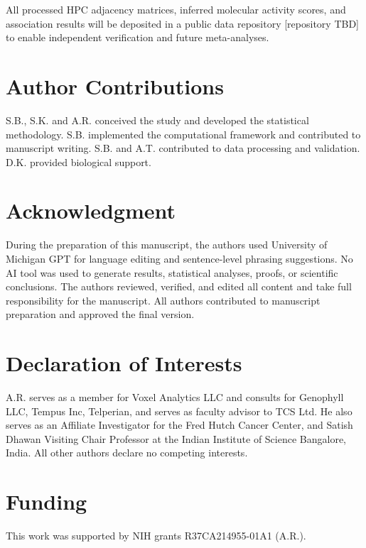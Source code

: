\documentclass[pdflatex,article,12pt]{article}
\begin{document}
All processed HPC adjacency matrices, inferred molecular activity scores, and association results will be deposited in a public data repository [repository TBD] to enable independent verification and future meta-analyses. 

\section{Author Contributions}
S.B., S.K. and A.R. conceived the study and developed the statistical methodology. S.B. implemented the computational framework and contributed to manuscript writing. S.B. and A.T. contributed to data processing and validation. D.K. provided biological support.

\section{Acknowledgment}

During the preparation of this manuscript, the authors used University of Michigan GPT for language editing and sentence-level phrasing suggestions. No AI tool was used to generate results, statistical analyses, proofs, or scientific conclusions. The authors reviewed, verified, and edited all content and take full responsibility for the manuscript. All authors contributed to manuscript preparation and approved the final version. 

\section{Declaration of Interests}

A.R. serves as a member for Voxel Analytics LLC and consults for Genophyll LLC, Tempus Inc, Telperian, and serves as faculty advisor to TCS Ltd. He also serves as an Affiliate Investigator for the Fred Hutch Cancer Center, and Satish Dhawan Visiting Chair Professor at the Indian Institute of Science Bangalore, India. All other authors declare no competing interests.

\section{Funding}
This work was supported by NIH grants R37CA214955-01A1 (A.R.).


\newpage
\end{document}

